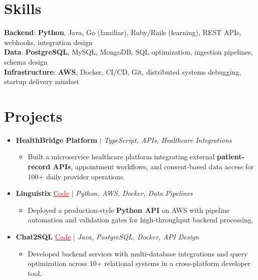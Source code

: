 \documentclass[letterpaper,10pt]{article}
\newcommand{\resumeItem}[1]{\item\small{{#1 \vspace{-2pt}}}}
\newcommand{\resumeProjectHeading}[1]{\item \small #1 \vspace{-2pt}}
\newcommand{\resumeSubHeadingListStart}{\begin{itemize}[leftmargin=0.0in, label={}]}
\newcommand{\resumeSubHeadingListEnd}{\end{itemize}}
\newcommand{\resumeProjItemListStart}{\begin{itemize}[leftmargin=0.15in,label=\textbullet,itemsep=0pt,topsep=0pt,parsep=0pt,partopsep=0pt]}
\newcommand{\resumeProjItemListEnd}{\end{itemize}\vspace{-4pt}}
\begin{document}
\section{Skills}
\begin{itemize}[leftmargin=0.15in, label={}]
\small{\item{
\textbf{Backend}: \textbf{Python}, Java, Go (familiar), Ruby/Rails (learning), REST APIs, webhooks, integration design \\
\textbf{Data}: \textbf{PostgreSQL}, MySQL, MongoDB, SQL optimization, ingestion pipelines, schema design \\
\textbf{Infrastructure}: \textbf{AWS}, Docker, CI/CD, Git, distributed systems debugging, startup delivery mindset
}}
\end{itemize}
\vspace{-16pt}
\section{Projects}
\resumeSubHeadingListStart
\vspace{-2pt}
\resumeProjectHeading{\textbf{HealthBridge Platform} $|$ \emph{TypeScript, APIs, Healthcare Integrations}}
\resumeProjItemListStart
\resumeItem{Built a microservice healthcare platform integrating external \textbf{patient-record APIs}, appointment workflows, and consent-based data access for 100+ daily provider operations.}
\resumeProjItemListEnd
\vspace{3pt}
\resumeProjectHeading{\textbf{Linguistix} {\href{https://github.com/SAHAJ-BHADJA/Linguistix}{\textcolor{red}{\underline{Code}}}} $|$ \emph{Python, AWS, Docker, Data Pipelines}}
\resumeProjItemListStart
\resumeItem{Deployed a production-style \textbf{Python API} on AWS with pipeline automation and validation gates for high-throughput backend processing.}
\resumeProjItemListEnd
\vspace{3pt}
\resumeProjectHeading{\textbf{Chat2SQL} {\href{https://github.com/SAHAJ-BHADJA/Chat2SQL}{\textcolor{red}{\underline{Code}}}} $|$ \emph{Java, PostgreSQL, Docker, API Design}}
\resumeProjItemListStart
\resumeItem{Developed backend services with multi-database integrations and query optimization across 10+ relational systems in a cross-platform developer tool.}
\resumeProjItemListEnd
\resumeSubHeadingListEnd
\end{document}
